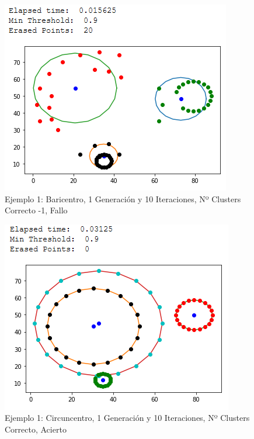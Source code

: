 \documentclass[conference,a4paper]{IEEEtran}
\begin{document}
\begin{figure}[H]
\centering
\includegraphics[scale=0.65]{Experimentacion/Ejemplo1/ej1_b_1_10_lc}
\caption{Ejemplo 1: Baricentro, 1 Generación y 10 Iteraciones,  Nº Clusters Correcto -1, Fallo\\}
\end{figure}

\begin{figure}[H]
\centering
\includegraphics[scale=0.65]{Experimentacion/Ejemplo1/ej1_c_1_10_cc}
\caption{Ejemplo 1: Circuncentro, 1 Generación y 10 Iteraciones,  Nº Clusters Correcto, Acierto\\}
\end{figure}
\end{document}
